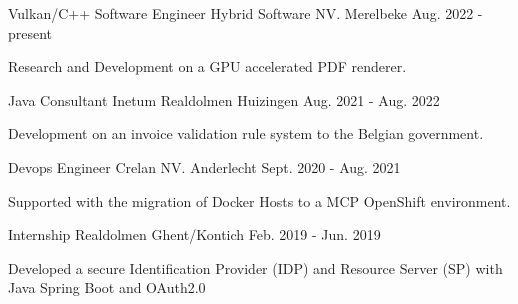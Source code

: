 

\begin{cventries}

  \cvlistentry
    {Vulkan/C++ Software Engineer} %
    {Hybrid Software NV.} %
    {Merelbeke} %
    {Aug. 2022 - present} %
    {
      \begin{cvitems} %
		  \item{Research and Development on a GPU accelerated PDF renderer.}
      \end{cvitems}
  	}

  \cvlistentry
    {Java Consultant} %
    {Inetum Realdolmen} %
    {Huizingen} %
    {Aug. 2021 - Aug. 2022} %
    {
      \begin{cvitems} %
	    \item {Development on an invoice validation rule system to the Belgian government.}
      \end{cvitems}
  	}

  \cvlistentry
    {Devops Engineer} %
    {Crelan NV.} %
    {Anderlecht} %
    {Sept. 2020 - Aug. 2021} %
    {
      \begin{cvitems} %
	    \item {Supported with the migration of Docker Hosts to a MCP OpenShift environment.}
      \end{cvitems}
  	}

  \cvlistentry
    {Internship} %
    {Realdolmen} %
    {Ghent/Kontich} %
    {Feb. 2019 - Jun. 2019} %
    {
      \begin{cvitems} %
	    \item {Developed a secure Identification Provider (IDP) and Resource Server (SP) with Java Spring Boot and OAuth2.0}
      \end{cvitems}
    }

\end{cventries}
